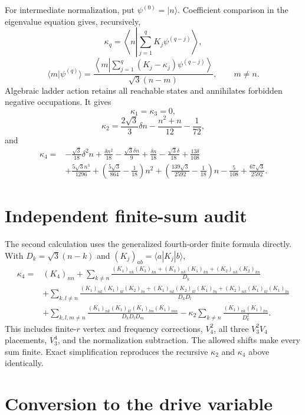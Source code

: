 \documentclass[11pt]{article}
\begin{document}
For intermediate normalization, put \(\psi^{(0)}=|n\rangle\).  Coefficient
comparison in the eigenvalue equation gives, recursively,
\[
\kappa_q=\left\langle n\left|
\sum_{j=1}^qK_j\psi^{(q-j)}\right.\right\rangle,
\]
\[
\langle m|\psi^{(q)}\rangle=
\frac{\left\langle m\left|
\sum_{j=1}^q(K_j-\kappa_j)\psi^{(q-j)}
\right.\right\rangle}{\sqrt3(n-m)},\qquad m\ne n.
\]
Algebraic ladder action retains all reachable states and annihilates
forbidden negative occupations.  It gives
\[
\kappa_1=\kappa_3=0,
\]
\[
\kappa_2=\frac{2\sqrt3}{3}\delta n
-\frac{n^2+n}{12}-\frac1{72},
\]
and
\begin{align*}
\kappa_4={}&-\frac{\sqrt3}{18}\delta^2n
+\frac{\delta n^2}{18}-\frac{\sqrt3\delta n}{9}
+\frac{\delta n}{18}-\frac{\sqrt3\delta}{18}+\frac{13\delta}{108}\\
&+\frac{5\sqrt3 n^3}{1296}
+\left(\frac{5\sqrt3}{864}-\frac1{18}\right)n^2
+\left(\frac{139\sqrt3}{2592}-\frac1{18}\right)n
-\frac5{108}+\frac{67\sqrt3}{2592}.
\end{align*}

\section{Independent finite-sum audit}

The second calculation uses the generalized fourth-order finite formula
directly.  With \(D_k=\sqrt3(n-k)\) and
\((K_j)_{ab}=\langle a|K_j|b\rangle\),
\begin{align*}
\kappa_4={}&(K_4)_{nn}
+\sum_{k\ne n}\frac{(K_1)_{nk}(K_3)_{kn}
+(K_3)_{nk}(K_1)_{kn}+(K_2)_{nk}(K_2)_{kn}}{D_k}\\
&+\sum_{k,l\ne n}\frac{
(K_1)_{nk}(K_1)_{kl}(K_2)_{ln}
+(K_1)_{nk}(K_2)_{kl}(K_1)_{ln}
+(K_2)_{nk}(K_1)_{kl}(K_1)_{ln}}{D_kD_l}\\
&+\sum_{k,l,m\ne n}\frac{
(K_1)_{nk}(K_1)_{kl}(K_1)_{lm}(K_1)_{mn}}{D_kD_lD_m}
-\kappa_2\sum_{k\ne n}\frac{(K_1)_{nk}(K_1)_{kn}}{D_k^2}.
\end{align*}
This includes finite-\(r\) vertex and frequency corrections, \(V_4^2\),
all three \(V_3^2V_4\) placements, \(V_3^4\), and the normalization
subtraction.  The allowed shifts make every sum finite.  Exact simplification
reproduces the recursive \(\kappa_2\) and \(\kappa_4\) above identically.

\section{Conversion to the drive variable}
\end{document}
